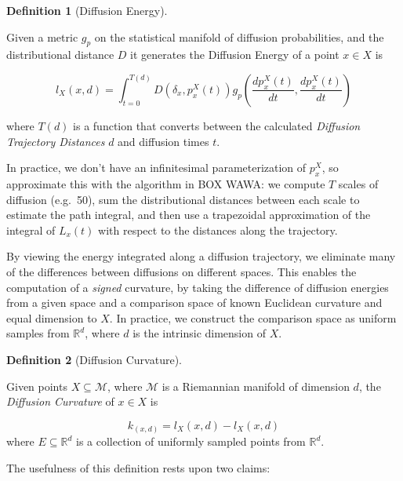 \documentclass[
  letterpaper,
  DIV=11,
  numbers=noendperiod]{scrartcl}
\theoremstyle{plain}
\theoremstyle{definition}
\theoremstyle{plain}
\theoremstyle{definition}
\newtheorem{definition}{Definition}[section]
\theoremstyle{plain}
\theoremstyle{remark}
\begin{document}
\begin{definition}[Diffusion
Energy]\protect\hypertarget{def-diffusion-energy-path-integral}{}\label{def-diffusion-energy-path-integral}

Given a metric \(g_{p}\) on the statistical manifold of diffusion
probabilities, and the distributional distance \(D\) it generates the
Diffusion Energy of a point \(x \in X\) is

\[
l_{X}(x, d)= \int_{t=0}^{T(d)} D\left(\delta_x, p_x^X(t)\right) g_p\left(\frac{d p_x^X(t)}{d t}, \frac{ d p_x^X(t) }{d t} \right)
\]

where \(T(d)\) is a function that converts between the calculated
\emph{Diffusion Trajectory Distances} \(d\) and diffusion times \(t\).

\end{definition}

In practice, we don't have an infinitesimal parameterization of
\(p_{x}^X\), so approximate this with the algorithm in BOX WAWA: we
compute \(T\) scales of diffusion (e.g.~50), sum the distributional
distances between each scale to estimate the path integral, and then use
a trapezoidal approximation of the integral of \(L_{x}(t)\) with respect
to the distances along the trajectory.

By viewing the energy integrated along a diffusion trajectory, we
eliminate many of the differences between diffusions on different
spaces. This enables the computation of a \emph{signed} curvature, by
taking the difference of diffusion energies from a given space and a
comparison space of known Euclidean curvature and equal dimension to
\(X\). In practice, we construct the comparison space as uniform samples
from \(\mathbb{R}^d\), where \(d\) is the intrinsic dimension of \(X\).

\begin{definition}[Diffusion
Curvature]\protect\hypertarget{def-diffusion-curvature}{}\label{def-diffusion-curvature}

Given points \(X \subseteq \mathcal{M}\), where \(\mathcal{M}\) is a
Riemannian manifold of dimension \(d\), the \emph{Diffusion Curvature}
of \(x \in X\) is

\[
k_(x, d) = l_{X}(x, d) - l_{X}(x, d)
\] where \(E \subseteq \mathbb{R}^d\) is a collection of uniformly
sampled points from \(\mathbb{R}^d\).

\end{definition}

The usefulness of this definition rests upon two claims:
\end{document}
